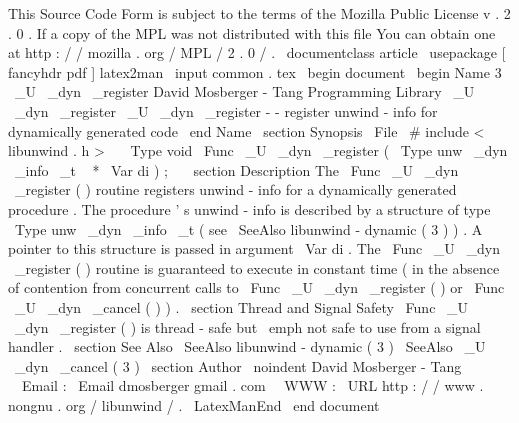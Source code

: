 %
This
Source
Code
Form
is
subject
to
the
terms
of
the
Mozilla
Public
%
License
v
.
2
.
0
.
If
a
copy
of
the
MPL
was
not
distributed
with
this
%
file
You
can
obtain
one
at
http
:
/
/
mozilla
.
org
/
MPL
/
2
.
0
/
.
\
documentclass
{
article
}
\
usepackage
[
fancyhdr
pdf
]
{
latex2man
}
\
input
{
common
.
tex
}
\
begin
{
document
}
\
begin
{
Name
}
{
3
}
{
\
_U
\
_dyn
\
_register
}
{
David
Mosberger
-
Tang
}
{
Programming
Library
}
{
\
_U
\
_dyn
\
_register
}
\
_U
\
_dyn
\
_register
-
-
register
unwind
-
info
for
dynamically
generated
code
\
end
{
Name
}
\
section
{
Synopsis
}
\
File
{
\
#
include
<
libunwind
.
h
>
}
\
\
\
Type
{
void
}
\
Func
{
\
_U
\
_dyn
\
_register
}
(
\
Type
{
unw
\
_dyn
\
_info
\
_t
~
*
}
\
Var
{
di
}
)
;
\
\
\
section
{
Description
}
The
\
Func
{
\
_U
\
_dyn
\
_register
}
(
)
routine
registers
unwind
-
info
for
a
dynamically
generated
procedure
.
The
procedure
'
s
unwind
-
info
is
described
by
a
structure
of
type
\
Type
{
unw
\
_dyn
\
_info
\
_t
}
(
see
\
SeeAlso
{
libunwind
-
dynamic
(
3
)
}
)
.
A
pointer
to
this
structure
is
passed
in
argument
\
Var
{
di
}
.
The
\
Func
{
\
_U
\
_dyn
\
_register
}
(
)
routine
is
guaranteed
to
execute
in
constant
time
(
in
the
absence
of
contention
from
concurrent
calls
to
\
Func
{
\
_U
\
_dyn
\
_register
}
(
)
or
\
Func
{
\
_U
\
_dyn
\
_cancel
}
(
)
)
.
\
section
{
Thread
and
Signal
Safety
}
\
Func
{
\
_U
\
_dyn
\
_register
}
(
)
is
thread
-
safe
but
\
emph
{
not
}
safe
to
use
from
a
signal
handler
.
\
section
{
See
Also
}
\
SeeAlso
{
libunwind
-
dynamic
(
3
)
}
\
SeeAlso
{
\
_U
\
_dyn
\
_cancel
(
3
)
}
\
section
{
Author
}
\
noindent
David
Mosberger
-
Tang
\
\
Email
:
\
Email
{
dmosberger
gmail
.
com
}
\
\
WWW
:
\
URL
{
http
:
/
/
www
.
nongnu
.
org
/
libunwind
/
}
.
\
LatexManEnd
\
end
{
document
}
